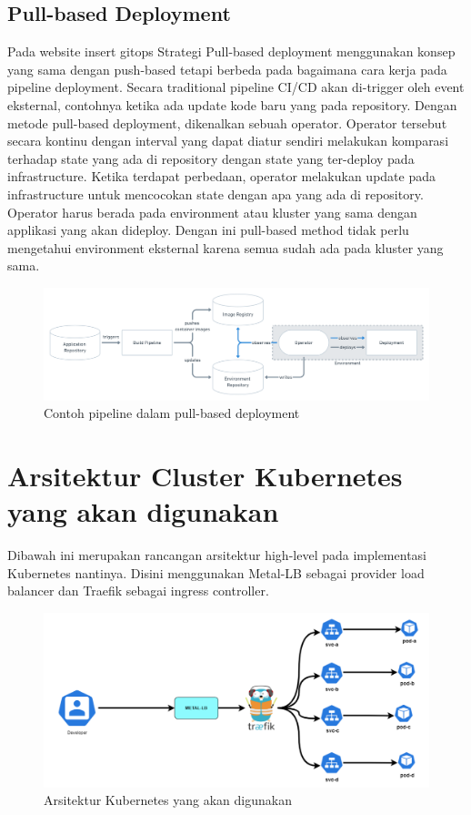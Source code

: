 \subsection{Pull-based Deployment}
Pada website insert gitops Strategi Pull-based deployment menggunakan konsep
yang sama dengan push-based tetapi berbeda pada bagaimana cara kerja pada pipeline deployment.
Secara traditional pipeline CI/CD akan di-trigger oleh event eksternal, contohnya ketika ada update kode
baru yang pada repository. Dengan metode pull-based deployment, dikenalkan sebuah operator.
Operator tersebut secara kontinu dengan interval yang dapat diatur sendiri melakukan komparasi
terhadap state yang ada di repository dengan state yang ter-deploy pada infrastructure.
Ketika terdapat perbedaan, operator melakukan update pada infrastructure untuk mencocokan state dengan apa yang ada di repository.
Operator harus berada pada environment atau kluster yang sama dengan applikasi yang akan dideploy. Dengan ini pull-based method
tidak perlu mengetahui environment eksternal karena semua sudah ada pada kluster yang sama.
\begin{figure}[h]
    \centering
    \includegraphics[width=1\textwidth]{figures/pull-based.png}
    \caption{Contoh pipeline dalam pull-based deployment}
\end{figure}
\vspace{0.5cm}

\newpage
\section{Arsitektur Cluster Kubernetes yang akan digunakan}
Dibawah ini merupakan rancangan arsitektur high-level pada implementasi Kubernetes
nantinya. Disini menggunakan Metal-LB sebagai provider load  balancer dan Traefik sebagai ingress controller.
\begin{figure}[h]
    \centering
    \includegraphics[width=1\textwidth]{figures/kubernetes-arch.png}
    \caption{Arsitektur Kubernetes yang akan digunakan}
\end{figure}
\newpage